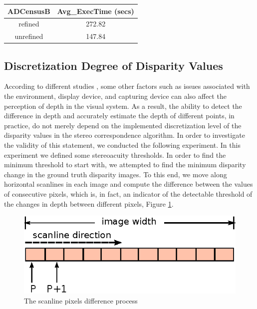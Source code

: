 \begin{minipage}{\linewidth}
\begin{center}
\label{tab:timerefNoref}
\begin{tabular}{|c|c|}
\hline
ADCensusB & Avg\_ExecTime (secs) \\ \hline
refined & 272.82 \\  \hline
unrefined & 147.84 \\ \hline
\end{tabular}
\end{center}
\end{minipage} \newline

\subsection{Discretization Degree of Disparity Values}
According to different studies \cite{dras96, kru10,azuma01}, some other factors such as issues associated with the environment, display device, and capturing device
can also affect the perception of depth in the visual system. As a result, the ability to detect the difference in depth and accurately estimate the
depth of different points, in practice,
do not merely depend on the implemented discretization level of the disparity values in the stereo correspondence algorithm.
In order to investigate the validity of this statement, we conducted the following experiment. In this experiment we defined some stereoacuity thresholds. 
In order to find the minimum threshold to start with, we attempted to find the 
minimum disparity change in the ground truth disparity images. To this end, we move along horizontal scanlines in each image and 
compute the difference between the values of consecutive pixels, which is, in fact, an indicator of the detectable threshold of the changes in depth between
different pixels, Figure \ref{fig:scanline}. 

\begin{figure}[H]
\centering
\includegraphics{scanline}
\caption{The scanline pixels difference process}
\label{fig:scanline}
\end{figure} 

